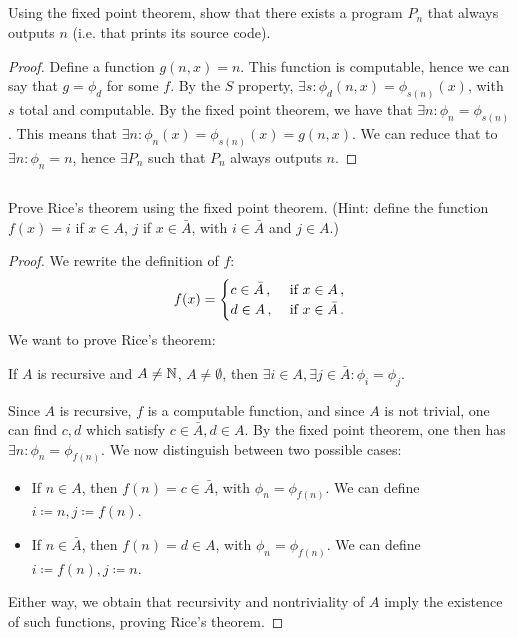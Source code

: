 \subsection{} %
Using the fixed point theorem, show that there exists a program \(P_n\)
that always outputs \(n\) (i.e. that prints its source code).

\begin{solution}
\begin{proof}
	Define a function \(g(n, x) = n\).
	This function is computable,
	hence we can say that \(g = \phi_d\) for some \(f\).
	By the \(S\) property,
	\(\exists s : \phi_d(n, x) = \phi_{s(n)}(x)\),
	with \(s\) total and computable.
	By the fixed point theorem,
	we have that \(\exists n : \phi_n = \phi_{s(n)}\).
	This means that \(\exists n: \phi_n(x) = \phi_{s(n)}(x) = g(n, x)\).
	We can reduce that to \(\exists n :\phi_n = n\),
	hence \(\exists P_n\) such that \(P_n\) always outputs \(n\).
\end{proof}
\end{solution}

\subsection{} %
Prove Rice's theorem using the fixed point theorem.
(Hint: define the function \(f(x) = i\) if \(x\in A\), \(j\) if \(x\in\bar{A}\),
with \(i \in \bar{A}\) and \(j \in A\).)

\begin{solution}
\begin{proof}
	We rewrite the definition of \(f\):
	\[
	f(x) = \begin{cases} c \in \bar{A}\,, & \textnormal{ if } x \in A\,,\\
	d \in A\,, & \textnormal{ if } x \in \bar{A}\,. \end{cases}
	\]
	We want to prove Rice's theorem:
	\begin{mytheo}
		If \(A\) is recursive and \(A \ne \mathbb{N}\), \(A \ne \emptyset\),
		then \(\exists i \in A, \exists j \in \bar{A}:
		\phi_i = \phi_j\).
	\end{mytheo}
	Since \(A\) is recursive,
	\(f\) is a computable function,
	and since \(A\) is not trivial,
	one can find \(c, d\) which satisfy \(c \in \bar{A}, d \in A\).
	By the fixed point theorem, one then has
	\(\exists n : \phi_n = \phi_{f(n)}\).
	We now distinguish between two possible cases:
	\begin{itemize}
		\item If \(n \in A\), then \(f(n) = c \in \bar{A}\),
		with \(\phi_n = \phi_{f(n)}\).
		We can define \(i \coloneqq n, j \coloneqq f(n)\).
		\item If \(n \in \bar{A}\), then \(f(n) = d \in A\),
		with \(\phi_n = \phi_{f(n)}\).
		We can define \(i \coloneqq f(n), j \coloneqq n\).
	\end{itemize}
	Either way, we obtain that recursivity and nontriviality of \(A\)
	imply the existence of such functions, proving Rice's theorem.
\end{proof}
\end{solution}

